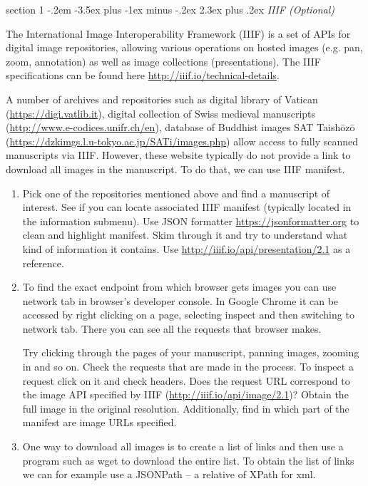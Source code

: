 \documentclass[12pt]{article}
\makeatletter
\newenvironment{problem}{\@startsection
	{section}
	{1}
	{-.2em}
	{-3.5ex plus -1ex minus -.2ex}
	{2.3ex plus .2ex}
	{\pagebreak[3]%
		\large\bf\noindent{Exercise }
	}
}
{\vspace{0.8cm}}
\makeatother
\begin{document}
\begin{problem}{\it IIIF (Optional)}
	
	The International Image Interoperability Framework (IIIF) is a set of APIs for digital image repositories, allowing various operations on hosted images (e.g. pan, zoom, annotation) as well as image collections (presentations). The IIIF specifications can be found here \url{http://iiif.io/technical-details}. 
	
	A number of archives and repositories such as digital library of Vatican (\url{https://digi.vatlib.it}), digital collection of Swiss medieval manuscripts (\url{http://www.e-codices.unifr.ch/en}), database of Buddhist images SAT Taishōzō (\url{https://dzkimgs.l.u-tokyo.ac.jp/SATi/images.php}) allow access to fully scanned manuscripts via IIIF.
	However, these website typically do not provide a link to download all images in the manuscript. To do that, we can use IIIF manifest.
	
	\begin{enumerate}[label=\textbf{\alph*)},leftmargin=*]
		\item Pick one of the repositories mentioned above and find a manuscript of interest. See if you can locate associated IIIF manifest (typically located in the information submenu). Use JSON formatter \url{https://jsonformatter.org} to clean and highlight manifest. Skim through it and try to understand what kind of information it contains. Use \url{http://iiif.io/api/presentation/2.1} as a reference.
		
		\item To find the exact endpoint from which browser gets images you can use network tab in browser's developer console. In Google Chrome it can be accessed by right clicking on a page, selecting inspect and then switching to network tab. There you can see all the requests that browser makes.
		
		Try clicking through the pages of your manuscript, panning images, zooming in and so on. Check the requests that are made in the process. To inspect a request click on it and check headers. Does the request URL correspond to the image API specified by IIIF (\url{http://iiif.io/api/image/2.1})? Obtain the full image in the original resolution.
		Additionally, find in which part of the manifest are image URLs specified.
		
		\item One way to download all images is to create a list of links and then use a program such as wget to download the entire list. To obtain the list of links we can for example use a JSONPath -- a relative of XPath for xml.
		

\end{enumerate}
\end{problem}
\end{document}
